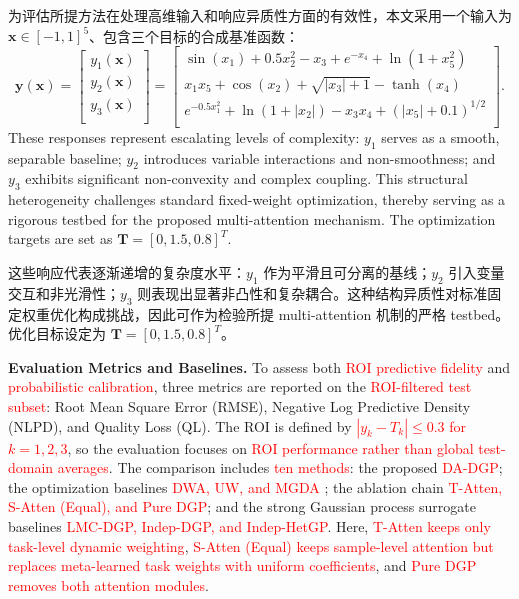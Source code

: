 \documentclass[11pt]{article}
\begin{document}
为评估所提方法在处理高维输入和响应异质性方面的有效性，本文采用一个输入为 $\mathbf{x} \in [-1, 1]^5$、包含三个目标的合成基准函数：
\begin{equation}
	\mathbf{y}(\mathbf{x})=\left[ \begin{matrix}
		{{y}_{1}}(\mathbf{x})  \\
		{{y}_{2}}(\mathbf{x})  \\
		{{y}_{3}}(\mathbf{x})  \\
	\end{matrix} \right]=\left[ \begin{matrix}
		\sin ({{x}_{1}})+0.5x_{2}^{2}-{{x}_{3}}+{{e}^{-{{x}_{4}}}}+\ln (1+x_{5}^{2})  \\
		{{x}_{1}}{{x}_{5}}+\cos ({{x}_{2}})+\sqrt{|{{x}_{3}}|+1}-\tanh ({{x}_{4}})  \\
		{{e}^{-0.5x_{1}^{2}}}+\ln (1+|{{x}_{2}}|)-{{x}_{3}}{{x}_{4}}+{{(|{{x}_{5}}|+0.1)}^{1/2}}  \\
	\end{matrix} \right].
\end{equation}
These responses represent escalating levels of complexity: $y_1$ serves as a smooth, separable baseline; $y_2$ introduces variable interactions and non-smoothness; and $y_3$ exhibits significant non-convexity and complex coupling. This structural heterogeneity challenges standard fixed-weight optimization, thereby serving as a rigorous testbed for the proposed multi-attention mechanism. The optimization targets are set as $\mathbf{T}=[0, 1.5, 0.8]^T$.

这些响应代表逐渐递增的复杂度水平：$y_1$ 作为平滑且可分离的基线；$y_2$ 引入变量交互和非光滑性；$y_3$ 则表现出显著非凸性和复杂耦合。这种结构异质性对标准固定权重优化构成挑战，因此可作为检验所提 multi-attention 机制的严格 testbed。优化目标设定为 $\mathbf{T}=[0, 1.5, 0.8]^T$。

\textbf{Evaluation Metrics and Baselines.} To assess both \textcolor{red}{ROI predictive fidelity} and \textcolor{red}{probabilistic calibration}, three metrics are reported on the \textcolor{red}{ROI-filtered test subset}: Root Mean Square Error (RMSE), Negative Log Predictive Density (NLPD), and Quality Loss (QL). The ROI is defined by \textcolor{red}{$|y_k-T_k|\leq 0.3$ for $k=1,2,3$}, so the evaluation focuses on \textcolor{red}{ROI performance rather than global test-domain averages}. The comparison includes \textcolor{red}{ten methods}: the proposed \textcolor{red}{DA-DGP}; the optimization baselines \textcolor{red}{DWA, UW, and MGDA \citep{Liu2019,Kendall2018,Sener2018}}; the ablation chain \textcolor{red}{T-Atten, S-Atten (Equal), and Pure DGP}; and the strong Gaussian process surrogate baselines \textcolor{red}{LMC-DGP, Indep-DGP, and Indep-HetGP}. Here, \textcolor{red}{T-Atten keeps only task-level dynamic weighting}, \textcolor{red}{S-Atten (Equal) keeps sample-level attention but replaces meta-learned task weights with uniform coefficients}, and \textcolor{red}{Pure DGP removes both attention modules}.
\end{document}
